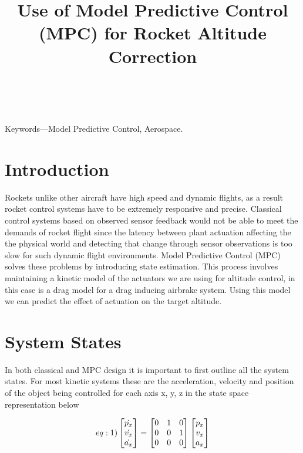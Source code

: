 \documentclass[conference, letterpaper]{IEEEtran}
\title{ Use of Model Predictive Control (MPC) for Rocket Altitude Correction }
\author{ \IEEEauthorblockN{Nikhil Peri, Anthony Lin, Manit Ginoya, Paul Buzuloiu } \
\IEEEauthorblockA{uOttawa Rocketry Team \\ \{nperi104, alin102
mgino015, pbuzu025\}@uottawa.ca} }
\begin{document}
\maketitle
\begin{abstract}
\end{abstract}

Keywords—Model Predictive Control, Aerospace.  \section{Introduction}

Rockets unlike other aircraft have high speed and dynamic flights, as a result
rocket control systems have to be extremely responsive and precise. Classical
control systems based on observed sensor feedback would not be able to meet the
demands of rocket flight since the latency between plant actuation affecting the
the physical world and detecting that change through sensor observations is too
slow for such dynamic flight environments. Model Predictive Control (MPC) solves
these problems by introducing state estimation.  This process involves maintaining
a kinetic model of the actuators we are using for altitude control, in this case
is a drag model for a drag inducing airbrake system. Using this model we can predict
the effect of actuation on the target altitude.

\section{System States}
In both classical and MPC design it is important to first outline all the system states.
For most kinetic systems these are the acceleration, velocity and position of the object
being controlled for each axis x, y, z in the state space representation below

\begin{equation}  \label(eq:1)
\begin{bmatrix}\dot{p_x}\\\dot{v_x}\\\dot{a_x}\end{bmatrix}=
\begin{bmatrix} 0 & 1 & 0 \\ 0 & 0 & 1 \\ 0 & 0 & 0 \end{bmatrix}
\begin{bmatrix}p_x\\v_x\\a_x\end{bmatrix}
\end{equation}
\end{document}
